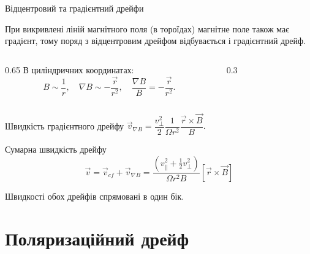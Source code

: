 \documentclass[]{beamer}
\begin{document}
\begin{frame}{Відцентровий та градієнтний дрейфи}{}
	\begin{block}{}\justifying
		При викривлені ліній магнітного поля (в тороїдах) магнітне поле також має градієнт, тому \alert{поряд з відцентровим дрейфом відбувається і градієнтний дрейф}.
	\end{block}
	\begin{columns}
		\begin{column}{0.65\linewidth}
			В циліндричних координатах:
			\begin{equation*}
				B \sim \frac1r, \quad \nabla B \sim -\frac{\vec{r}}{r^2}, \quad \frac{\nabla B}{B} = -\frac{\vec{r}}{r^2}.
			\end{equation*}
		\end{column}
		\begin{column}{0.3\linewidth}
			\centering
			
		\end{column}
	\end{columns}
	Швидкість градієнтного дрейфу
	\(
	\vec{v}_{\nabla{B}} = \dfrac{v_\perp^2}2 \dfrac1{\Omega r^2}\dfrac{\vec{r}\times\vec{B}}{B}.
	\)

	\begin{block}{Сумарна швидкість дрейфу}
		\begin{equation*}
			\vec{v} = \vec{v}_{cf} + \vec{v}_{\nabla B}  = \frac{\left(v^2_\parallel + \frac12 v^2_\perp \right) }{\Omega r^2B}\left[ \vec{r}\times\vec{B}\right]
		\end{equation*}
	\end{block}
	\begin{alertblock}{}
		Швидкості обох дрейфів спрямовані в один бік.
	\end{alertblock}
\end{frame}




\section{Поляризаційний дрейф}
\end{document}
